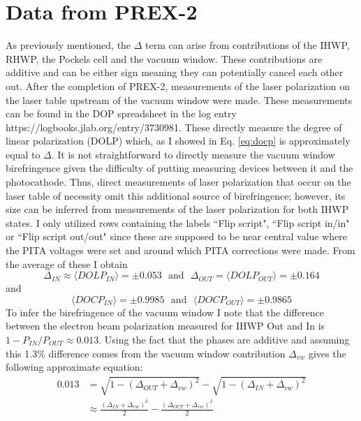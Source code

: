 \documentclass[12pt]{article}
\begin{document}
\section{Data from PREX-2}
As previously mentioned, the $\Delta$ term can arise from contributions of the IHWP, RHWP, the Pockels cell and the vacuum window. These contributions are additive and can be either sign meaning they can potentially cancel each other out. After the completion of PREX-2, measurements of the laser polarization on the laser table upstream of the vacuum window were made. These measurements can be found in the DOP spreadsheet in the log entry  https://logbooks.jlab.org/entry/3730981. These directly measure the degree of linear polarization (DOLP) which, as I showed in Eq. \ref{eq:docp} is approximately equal to $\Delta$. It is not straightforward to directly measure the vacuum window birefringence given the difficulty of putting measuring devices between it and the photocathode. Thus, direct measurements of laser polarization that occur on the laser table of necessity omit this additional source of birefringence; however, its size can be inferred from measurements of the laser polarization for both IHWP states. I only utilized rows containing the labels ``Flip script", ``Flip script in/in" or ``Flip script out/out" since these are supposed to be near central value where the PITA voltages were set and around which PITA corrections were made. From the average of these I obtain
\[ 
\Delta_{IN}\approx\langle DOLP_{IN} \rangle=\pm0.053 ~~~ \textrm{and}~~~ \Delta_{OUT}=\langle DOLP_{OUT} \rangle=\pm0.164
\]
and 
\begin{equation}
\label{eq:docp2}
\langle DOCP_{IN} \rangle=\pm0.9985 ~~~ \textrm{and}~~~ \langle DOCP_{OUT} \rangle=\pm0.9865
\end{equation}
To infer the birefringence of the vacuum window I note that the difference between the electron beam polarization measured for IHWP Out and In is $1-P_{IN}/P_{OUT}\approx 0.013.$ Using the fact that the phases are additive and assuming this 1.3\% difference comes from the vacuum window contribution $\Delta_{vw}$ gives the following approximate equation:
\begin{equation}
\label{eq:soln}
\begin{split}
0.013&=\sqrt{1-(\Delta_{OUT}+\Delta_{vw})^2}-\sqrt{1-(\Delta_{IN}+\Delta_{vw})^2}\\
~&\approx\frac{\left(\Delta_{IN}+\Delta_{vw}\right)^2}{2}-\frac{\left(\Delta_{OUT}+\Delta_{vw}\right)^2}{2}
\end{split}
\end{equation}
\end{document}
